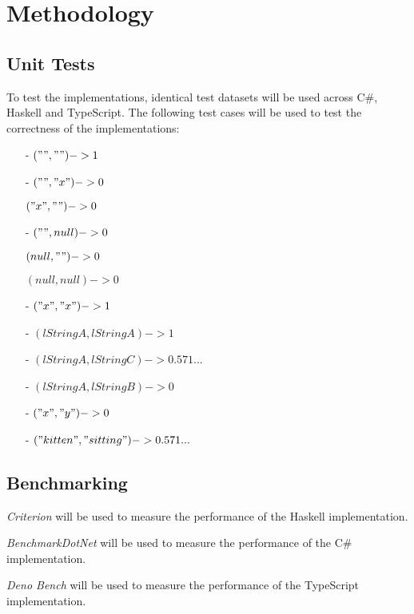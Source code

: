 \section{Methodology}

\subsection{Unit Tests}
To test the implementations, identical test datasets will be used across C\#, Haskell and
TypeScript. The following test cases will be used to test the correctness of the implementations:

\begin{enumerate}
  \item[-]  $("", "") -> 1$
  \item[-] \makebox[2cm]{\hfill=} $("", "x") -> 0$
  \item[ ] \makebox[2cm]{\hfill=} $("x", "") -> 0$
  \item[-]  $("", null) -> 0$
  \item[ ] \makebox[2cm]{\hfill=} $(null, "") -> 0$
  \item[ ] \makebox[2cm]{\hfill=} $(null, null) -> 0$
  \item[-]  $("x", "x") -> 1$
  \item[-]  $(lStringA, lStringA) -> 1$
  \item[-]  $(lStringA, lStringC) -> 0.571...$
  \item[-] \makebox[2cm]{\hfill=} $(lStringA, lStringB) -> 0$
  \item[-]  $("x", "y") -> 0$
  \item[-]  $("kitten", "sitting") -> 0.571...$
\end{enumerate}

\subsection{Benchmarking}
\label{ssec:m-benchmarks}
\textit{Criterion} will be used to measure the performance of the Haskell implementation.

\textit{BenchmarkDotNet} will be used to measure the performance of the C\# implementation.

\textit{Deno Bench} will be used to measure the performance of the TypeScript implementation.

